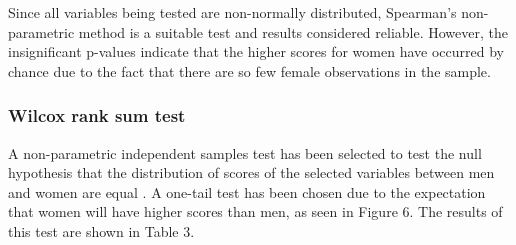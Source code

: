 Since all variables being tested are non-normally distributed, Spearman's non-parametric method is a suitable test and results considered reliable. However, the insignificant p-values indicate that the higher scores for women have occurred by chance due to the fact that there are so few female observations in the sample.



\subsubsection{Wilcox rank sum test}


A non-parametric independent samples test has been selected to test the null hypothesis that the distribution of scores of the selected variables between men and women are equal \citep{Coolican2014}. A one-tail test has been chosen due to the expectation that women will have higher scores than men, as seen in Figure 6. The results of this test are shown in Table 3. 

